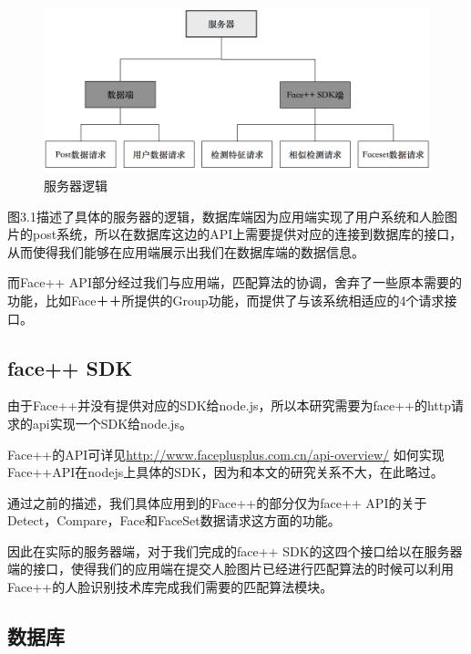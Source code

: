 \begin{figure}[h]
\centering
\includegraphics[width=\textwidth]{img/chap3/server.png}
\caption{服务器逻辑\label{Face++API}}
\end{figure}
 
图3.1描述了具体的服务器的逻辑，数据库端因为应用端实现了用户系统和人脸图片的post系统，所以在数据库这边的API上需要提供对应的连接到数据库的接口，从而使得我们能够在应用端展示出我们在数据库端的数据信息。

而Face++ API部分经过我们与应用端，匹配算法的协调，舍弃了一些原本需要的功能，比如Face＋＋所提供的Group功能，而提供了与该系统相适应的4个请求接口。


\subsection{face++ SDK}
由于Face++并没有提供对应的SDK给node.js，所以本研究需要为face++的http请求的api实现一个SDK给node.js。

Face++的API可详见\url{http://www.faceplusplus.com.cn/api-overview/}
如何实现Face++API在nodejs上具体的SDK，因为和本文的研究关系不大，在此略过。

通过之前的描述，我们具体应用到的Face++的部分仅为face++ API的关于Detect，Compare，Face和FaceSet数据请求这方面的功能。

因此在实际的服务器端，对于我们完成的face++ SDK的这四个接口给以在服务器端的接口，使得我们的应用端在提交人脸图片已经进行匹配算法的时候可以利用Face++的人脸识别技术库完成我们需要的匹配算法模块。


\subsection{数据库}


